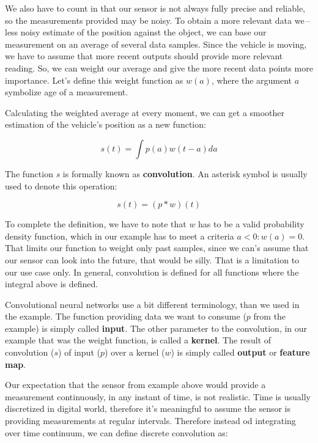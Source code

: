 We also have to count in that our sensor is not always fully precise and reliable, so the measurements provided may be noisy. To obtain a more relevant data we\,--\, less noisy estimate of the position against the object, we can base our measurement on an average of several data samples. Since the vehicle is moving, we have to assume that more recent outputs should provide more relevant reading. So, we can weight our average and give the more recent data points more importance. Let's define this weight function as $w(a)$, where the argument $a$ symbolize age of a measurement.

Calculating the weighted average at every moment, we can get a smoother estimation of the vehicle's position as a new function:

\begin{equation}
    s(t) = \int p(a) w(t - a) da
\end{equation}


The function $s$ is formally known as \textbf{convolution}. An asterisk symbol is usually used to denote this operation:

\begin{equation}
    s(t) = (p * w)(t)
\end{equation}

To complete the definition, we have to note that $w$ has to be a valid probability density function, which in our example has to meet a criteria $a < 0: w(a) = 0$. That limits our function to weight only past samples, since we can's assume that our sensor can look into the future, that would be silly. That is a limitation to our use case only. In general, convolution is defined for all functions where the integral above is defined.

Convolutional neural networks use a bit different terminology, than we used in the example. The function providing data we want to consume ($p$ from the example) is simply called \textbf{input}. The other parameter to the convolution, in our example that was the weight function, is called a \textbf{kernel}. The result of convolution ($s$) of input ($p$) over a kernel ($w$) is simply called \textbf{output} or \textbf{feature map}.

Our expectation that the sensor from example above would provide a measurement continuously, in any instant of time, is not realistic. Time is usually discretized in digital world, therefore it's meaningful to assume the sensor is providing measurements at regular intervals. Therefore instead od integrating over time continuum, we can define discrete convolution as:

